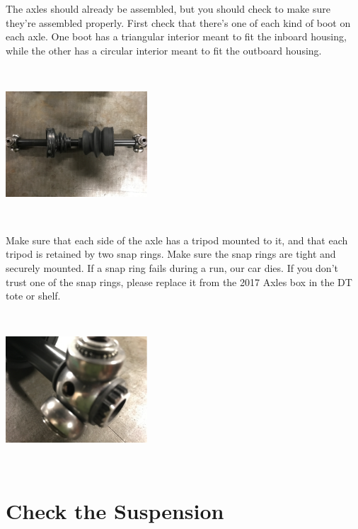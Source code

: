 \documentclass{article}
\begin{document}
The axles should already be assembled, but you should check to make sure they're assembled properly. First check that there's one of each kind of boot on each axle. One boot has a triangular interior meant to fit the inboard housing, while the other has a circular interior meant to fit the outboard housing.

\begin{minipage}{\linewidth}
$\,$

\begin{center}
\includegraphics[width = 150pt]{Axle.png}

\end{center}
$\,$
\end{minipage}

Make sure that each side of the axle has a tripod mounted to it, and that each tripod is retained by two snap rings. Make sure the snap rings are tight and securely mounted. If a snap ring fails during a run, our car dies. If you don't trust one of the snap rings, please replace it from the 2017 Axles box in the DT tote or shelf.

\begin{minipage}{\linewidth}
$\,$

\begin{center}
\includegraphics[width = 150pt]{TripodZoom.png}

\end{center}
$\,$
\end{minipage}

\section{Check the Suspension}
\end{document}
